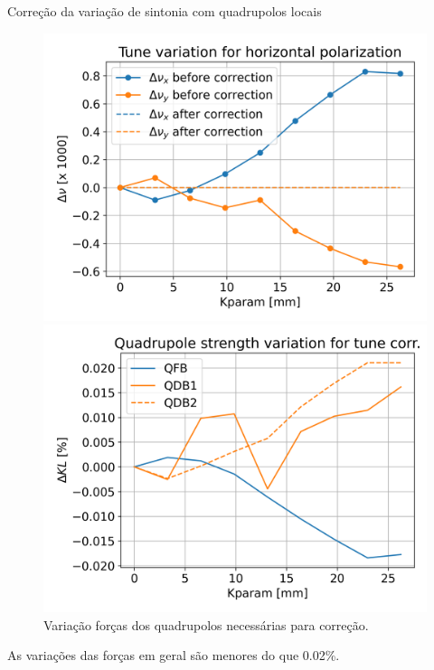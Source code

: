 \documentclass[1611]{beamer}					  %
\begin{document}
\begin{frame}{Correção da variação de sintonia com quadrupolos locais}
    \begin{figure}[ht]
        \begin{minipage}[b]{0.45\linewidth}
            \centering
            \includegraphics[width=\textwidth]{2024-04-19/figures/tune_corr_model.png}
            \caption{Correção das variações de sintonia usando modelo fitado.}
            \label{fig:a}
        \end{minipage}
        \hspace{0.5cm}
        \begin{minipage}[b]{0.45\linewidth}
            \centering
            \includegraphics[width=\textwidth]{2024-04-19/figures/Quad_stg.png}
            \caption{Variação forças dos quadrupolos necessárias para correção.}
            \label{fig:b}
        \end{minipage}
    \end{figure}
As variações das forças em geral são menores do que 0.02\%.
\end{frame}
\end{document}
